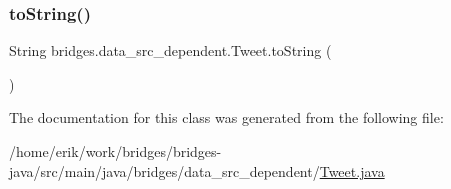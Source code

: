 \subsubsection{\texorpdfstring{to\+String()}{toString()}}
{\footnotesize\ttfamily String bridges.\+data\+\_\+src\+\_\+dependent.\+Tweet.\+to\+String (\begin{DoxyParamCaption}{ }\end{DoxyParamCaption})}



The documentation for this class was generated from the following file\+:\begin{DoxyCompactItemize}
\item 
/home/erik/work/bridges/bridges-\/java/src/main/java/bridges/data\+\_\+src\+\_\+dependent/\hyperlink{_tweet_8java}{Tweet.\+java}\end{DoxyCompactItemize}
